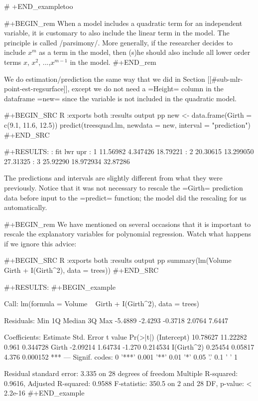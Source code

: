 # +END_exampletoo



#+BEGIN_rem
When a model includes a quadratic term for an independent variable, it
is customary to also include the linear term in the model. The
principle is called /parsimony/. More generally, if the researcher
decides to include \(x^{m}\) as a term in the model, then (s)he should
also include all lower order terms \(x\), \(x^{2}\), ...,\(x^{m-1}\)
in the model.
#+END_rem

We do estimation/prediction the same way that we did in Section
[[#sub-mlr-point-est-regsurface]], except we do not need a =Height= column
in the dataframe =new= since the variable is not included in the
quadratic model.

#+BEGIN_SRC R :exports both :results output pp 
new <- data.frame(Girth = c(9.1, 11.6, 12.5))
predict(treesquad.lm, newdata = new, interval = "prediction")
#+END_SRC

#+RESULTS:
:        fit       lwr      upr
: 1 11.56982  4.347426 18.79221
: 2 20.30615 13.299050 27.31325
: 3 25.92290 18.972934 32.87286

The predictions and intervals are slightly different from what they
were previously. Notice that it was not necessary to rescale the
=Girth= prediction data before input to the =predict= function; the
model did the rescaling for us automatically.

#+BEGIN_rem
We have mentioned on several occasions that it is important to rescale
the explanatory variables for polynomial regression. Watch what
happens if we ignore this advice:

#+BEGIN_SRC R :exports both :results output pp 
summary(lm(Volume ~ Girth + I(Girth^2), data = trees))
#+END_SRC

#+RESULTS:
#+BEGIN_example

Call:
lm(formula = Volume ~ Girth + I(Girth^2), data = trees)

Residuals:
    Min      1Q  Median      3Q     Max 
-5.4889 -2.4293 -0.3718  2.0764  7.6447 

Coefficients:
            Estimate Std. Error t value Pr(>|t|)    
(Intercept) 10.78627   11.22282   0.961 0.344728    
Girth       -2.09214    1.64734  -1.270 0.214534    
I(Girth^2)   0.25454    0.05817   4.376 0.000152 ***
---
Signif. codes:  0 '***' 0.001 '**' 0.01 '*' 0.05 '.' 0.1 ' ' 1

Residual standard error: 3.335 on 28 degrees of freedom
Multiple R-squared:  0.9616,	Adjusted R-squared:  0.9588 
F-statistic: 350.5 on 2 and 28 DF,  p-value: < 2.2e-16
#+END_example

